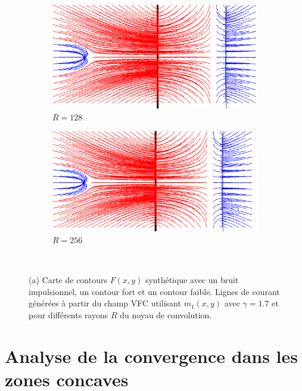 \begin{figure}[!h]
   \begin{subfigure}[c]{.5\linewidth}
     \centering
     \includegraphics[width=\textwidth]{Chapters/Images/m1_radius_128.png}
     \caption{$R=128$}
   \end{subfigure}
   \begin{subfigure}[c]{.5\linewidth}
     \centering
     \includegraphics[width=\textwidth]{Chapters/Images/m1_radius_256.png}
     \caption{$R=256$}
   \end{subfigure}\\
   
   \caption{(a) Carte de contours $F(x,y)$ synthétique avec un bruit impulsionnel, un contour fort et un contour faible. Lignes de courant générées à partir du champ VFC utilisant $m_1(x,y)$ avec $\gamma=1.7$ et pour différents rayons $R$ du noyau de convolution.}
   \label{fig:taille}
\end{figure}
\section{Analyse de la convergence dans les zones concaves}
\label{ann_concavities_results}

